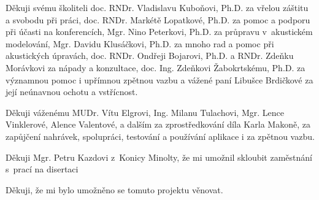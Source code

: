 Děkuji
svému školiteli doc. RNDr. Vladislavu Kuboňovi, Ph.D. za vřelou záštitu a svobodu při práci,
doc. RNDr. Markétě Lopatkové, Ph.D. za pomoc a podporu při účasti na konferencích,
Mgr. Nino Peterkovi, Ph.D. za průpravu v~akustickém modelování, 
Mgr. Davidu Klusáčkovi, Ph.D. za mnoho rad a pomoc při akustických úpravách,
doc. RNDr. Ondřeji Bojarovi, Ph.D.
a RNDr. Zdeňku Morávkovi za nápady a konzultace,
doc. Ing. Zdeňkovi Žabokrtskému, Ph.D. za významnou pomoc i upřímnou zpětnou vazbu
a vážené paní Libušce Brdičkové za její neúnavnou ochotu a vstřícnost.

Děkuji
váženému MUDr. Vítu Elgrovi,
Ing. Milanu Tulachovi,
Mgr. Lence Vinklerové,
Alence Valentové,
a dalším za zprostředkování díla Karla Makoně, za zapůjčení nahrávek,
spolupráci, testování a používání aplikace i za zpětnou vazbu.

Děkuji
Mgr. Petru Kazdovi z~Konicy Minolty, že mi umožnil skloubit zaměstnání s~prací na disertaci

Děkuji, že mi bylo umožněno se tomuto projektu věnovat.
